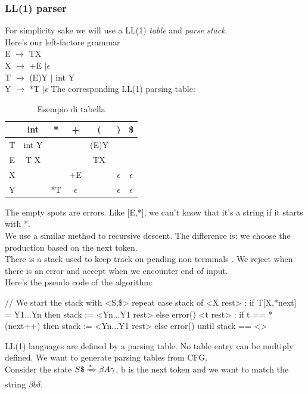 \documentclass[12pt]{article}
\begin{document}
\subsubsection{LL(1) parser} 
For simplicity sake we will use a LL(1) \emph{table} and \emph{parse stack}.
\\ Here's our left-factore grammar 
\\ E $\rightarrow$ TX
\\ X $\rightarrow$ +E $| \epsilon$
\\ T $\rightarrow$ (E)Y $|$ int Y
\\ Y $\rightarrow$ *T $| \epsilon$
\newpage
The corresponding LL(1) parsing table: 
\begin{table}[ht]
	\centering
	\begin{tabular}{|c|c|c|c|c|c|c|}
        \hline
        & int & * & + & ( & ) & \$ \\
        \hline
        T & int Y &  &  & (E)Y &  &  \\ 
        \hline
        E & T X &  &  & TX &  & \\ 
        \hline
        X &  &  & +E &  & $\epsilon$ & $\epsilon$ \\ 
        \hline
        Y &  & *T & $\epsilon$& & $\epsilon$ & $\epsilon$ \\
        \hline
	\end{tabular}
	\caption{Esempio di tabella}
\end{table}
The empty spots are errors. Like [E,*], we can't know that it's a string if it starts with *.
\\ We use a similar method to recursive descent. The difference is: we choose the production based on the next token. 
\\ There is a stack used to keep track on pending non terminals . 
We reject when there is an error and accept when we encounter end of input. 
\\ Here's the pseudo code of the algorithm: 
\begin{mycode}
    // We start the stack with <S,\$>
    repeat
        case stack of
        <X rest> : if T[X,*next] = Y1...Yn
            then stack := <Yn...Y1 rest>
            else error() 
        <t rest> : if t == *(next++)
            then stack := <Yn...Y1 rest>
            else error()
    until stack == <>
\end{mycode}
LL(1) languages are defined by a parsing table. 
No table entry can be multiply defined. 
We want to generate parsing tables from CFG.
\\ Consider the state $S\$ \xRightarrow[]{*} \beta A \gamma$, b is the next token and we want to match the string $\beta b \delta$.
\end{document}
